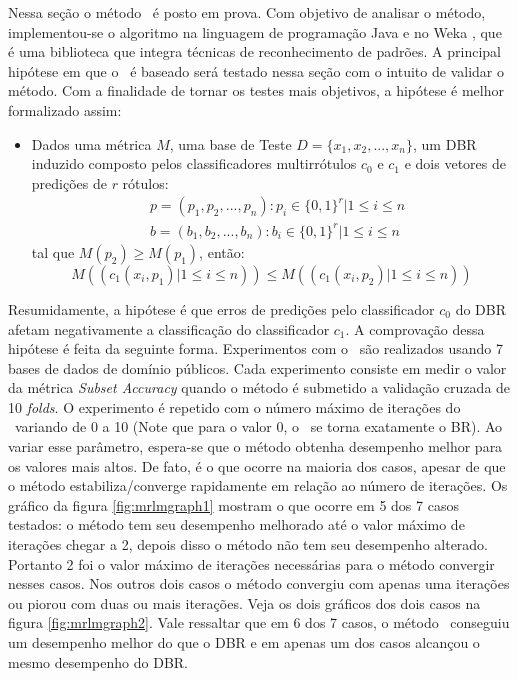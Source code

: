  Nessa seção o método \MRLMa~é posto em prova. Com objetivo de analisar o método, implementou-se o algoritmo
 na linguagem de programação Java e no Weka \cite{weka}, que é uma biblioteca que integra técnicas de reconhecimento de padrões.
 A principal hipótese em que o \MRLMa~é baseado será testado nessa seção com o intuito de validar o método.
 Com a finalidade de tornar os testes mais objetivos, a hipótese é melhor formalizado assim:
 \begin{itemize}

  \item Dados uma métrica $M$, uma base de Teste $D=\{x_1,x_2,...,x_n\}$,
  um DBR induzido composto pelos classificadores multirrótulos $c_0$ e $c_1$ e
  dois vetores de predições de $r$ rótulos:
  \begin{equation}
  \begin{split}
  & p=(p_1,p_2,...,p_n) : p_i \in {\{0,1\}}^r |1 \leq i \leq n \\
  & b=(b_1,b_2,...,b_n) : b_i \in {\{0,1\}}^r |1 \leq i \leq n
  \end{split}
  \end{equation}
  tal que $M(p_2) \geq M(p_1)$,
  então:
  \begin{equation}
  M((c_1(x_i,p_1) | 1 \leq i \leq n)) \leq M((c_1(x_i,p_2) | 1 \leq i \leq n))
  \end{equation}
 
 \end{itemize}

Resumidamente, a hipótese é que erros de predições pelo
classificador $c_0$ do DBR afetam negativamente a classificação do classificador $c_1$.
A comprovação dessa hipótese é feita da seguinte forma. Experimentos com o \MRLMa~são realizados
usando 7 bases de dados de domínio públicos. Cada experimento consiste em medir o valor da métrica \textit{Subset Accuracy}
quando o método é submetido a validação cruzada de 10 \textit{folds}.
O experimento é repetido com o número máximo de iterações do
\MRLMa~variando de 0 a 10 (Note que para o valor 0, o \MRLMa~se torna exatamente o BR).
Ao variar esse parâmetro, espera-se que o método obtenha desempenho melhor para os valores mais altos.
De fato, é o que ocorre na maioria dos casos, apesar de que o método estabiliza/converge rapidamente em relação ao
número de iterações.
Os gráfico da figura \ref{fig:mrlmgraph1} mostram o que ocorre em 5 dos 7 casos testados: o método tem seu desempenho melhorado
até o valor máximo de iterações chegar a 2, depois disso o método não tem seu desempenho alterado.
Portanto 2 foi o valor máximo de iterações necessárias para o método convergir nesses casos.
Nos outros dois casos o método convergiu com apenas uma iterações ou piorou 
com duas ou mais iterações. Veja os dois gráficos dos dois casos na figura \ref{fig:mrlmgraph2}.
Vale ressaltar que em 6 dos 7 casos, o método \MRLMa~conseguiu um desempenho melhor do que o DBR e em apenas um dos casos
alcançou o mesmo desempenho do DBR.



